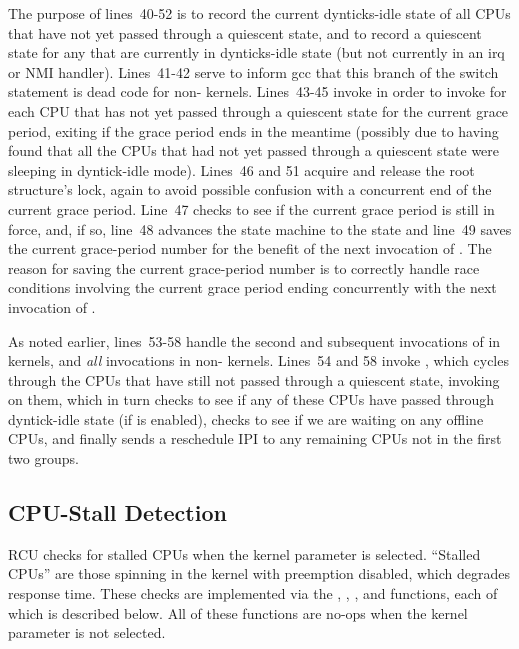 The purpose of lines~40-52 is to record the current dynticks-idle state
of all CPUs that have not yet passed through a quiescent state, and
to record a quiescent state for any that are currently in dynticks-idle
state (but not currently in an irq or NMI handler).
Lines~41-42 serve to inform gcc that this branch of the switch statement
is dead code for non- kernels.
Lines~43-45 invoke  in order to invoke
 for each CPU that has not yet
passed through a quiescent state for the current grace period,
exiting  if the grace period ends in
the meantime (possibly due to having found that all the CPUs that
had not yet passed through a quiescent state were sleeping in
dyntick-idle mode).
Lines~46 and 51 acquire and release the root  structure's
lock, again to avoid possible confusion with a concurrent end of the
current grace period.
Line~47 checks to see if the current grace period is still in force, and,
if so, line~48 advances the state machine to the  state
and line~49 saves the current grace-period number for the benefit of
the next invocation of .
The reason for saving the current grace-period number is to correctly
handle race conditions involving the current grace period ending
concurrently with the next invocation of .

As noted earlier, lines~53-58 handle the second and subsequent invocations
of  in  kernels, and \emph{all}
invocations in non- kernels.
Lines~54 and 58 invoke , which cycles through
the CPUs that have still not passed through a quiescent state, invoking
 on them, which in turn checks to see
if any of these CPUs have passed through dyntick-idle state (if
 is enabled), checks to see if we are waiting on
any offline CPUs, and finally sends a reschedule IPI to any remaining
CPUs not in the first two groups.

\subsection{CPU-Stall Detection}
\label{app:rcuimpl:rcutreewt:CPU-Stall Detection}

RCU checks for stalled CPUs when the 
kernel parameter is selected.
``Stalled CPUs'' are those spinning in the kernel with preemption disabled,
which degrades response time.
These checks are implemented via the ,
, , and
 functions, each of which is described
below.
All of these functions are no-ops when the 
kernel parameter is not selected.

